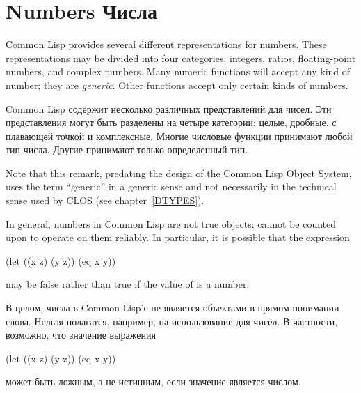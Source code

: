 
\clearpage\def\pagestatus{FINAL PROOF}

\begingroup
\def\arcsinh{\mathop\textrm{arcsinh}\nolimits}
\def\arccosh{\mathop\textrm{arccosh}\nolimits}
\def\arctanh{\mathop\textrm{arctanh}\nolimits}
\def\cis{\mathop\textrm{cis}\nolimits}
\def\phase{\mathop\textrm{phase}\nolimits}


\chapter{Numbers Числа}
\label{NUMBER}


Common Lisp provides several different representations for numbers.
These representations may be divided into four categories: integers,
ratios, floating-point numbers, and complex numbers.  Many numeric
functions will accept any kind of number; they are \emph{generic}.  Other
functions accept only certain kinds of numbers.

Common Lisp содержит несколько различных представлений для чисел.
Эти представления могут быть разделены на четыре категории: целые, дробные, с
плавающей точкой и комплексные. Многие числовые функции принимают любой тип
числа. Другие принимают только определенный тип.

\begin{new}
Note that this remark, predating the design of the Common Lisp Object System,
uses the term ``generic'' in a generic sense and not necessarily
in the technical sense used by CLOS
(see chapter~\ref{DTYPES}).
\end{new}

In general, numbers in Common Lisp are not true objects;  cannot
be counted upon to operate on them reliably.  In particular,
it is possible that the expression
\begin{lisp}
(let ((x z) (y z)) (eq x y))
\end{lisp}
may be false rather than true if the value of  is a number.

В целом, числа в Common Lisp'е не является объектами в прямом понимании
слова. Нельзя полагатся, например, на использование  для чисел. В
частности, возможно, что значение выражения
\begin{lisp}
(let ((x z) (y z)) (eq x y))
\end{lisp}
может быть ложным, а не истинным, если значение  является числом.


